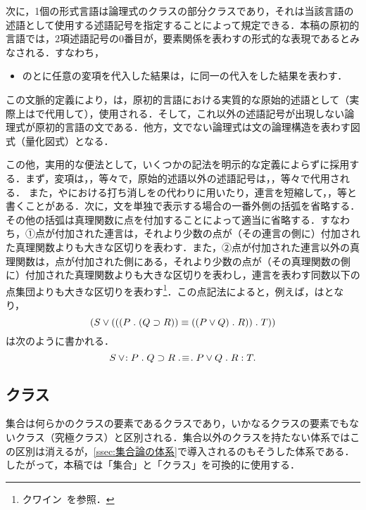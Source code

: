 次に，1個の形式言語は論理式のクラスの部分クラスであり，それは当該言語の述語として使用する述語記号を指定することによって規定できる．本稿の原初的言語では，$2$項述語記号の$0$番目が，要素関係を表わす\kagi{$ \in $}の形式的な表現であるとみなされる．すなわち，
\begin{itemize}
    \item \kagi{$\alpha\in\beta$}の\kagi{$\alpha$}と\kagi{$\beta$}に任意の変項を代入した結果は，に同一の代入をした結果を表わす．
\end{itemize}
この文脈的定義により，は，原初的言語における実質的な原始的述語として（実際上は\kagi{$ \in $}で代用して），使用される．そして，これ以外の述語記号が出現しない論理式が原初的言語の文である．他方，文でない論理式は文の論理構造を表わす図式（量化図式）となる．

この他，実用的な便法として，いくつかの記法を明示的な定義によらずに採用する．まず，変項は，，等々で，原始的述語以外の述語記号は，，等々で代用される．
また，\kagi{$\notin$}や\kagi{$\neq$}における打ち消しを\kagi{$\neg$}の代わりに用いたり，連言を短縮して，，等と書くことがある．次に，文を単独で表示する場合の一番外側の括弧を省略する．その他の括弧は真理関数に点を付加することによって適当に省略する．すなわち，①点が付加された連言は，それより少数の点が（その連言の側に）付加された真理関数よりも大きな区切りを表わす．また，②点が付加された連言以外の真理関数は，点が付加された側にある，それより少数の点が（その真理関数の側に）付加された真理関数よりも大きな区切りを表わし，連言を表わす同数以下の点集団よりも大きな区切りを表わす\footnote{
    クワイン~\cite[pp.\,26--28]{クワインb}を参照．
}．この点記法によると，例えば，はとなり，
\[
    (S\lor(((P\con{1}(Q\supset R))\equiv((P\lor Q)\con{1}R))\con{1}T))
\]
は次のように書かれる．
\[
    S\case{2}{0}{2}P\con{1}Q\supset R\case{3}{1}{1}P\lor Q\con{1}R\con{2}T.
\]

\subsection{クラス}
\label{ssec:クラス}

集合は何らかのクラスの要素であるクラスであり，いかなるクラスの要素でもないクラス（究極クラス）と区別される．集合以外のクラスを持たない体系ではこの区別は消えるが，\ref{ssec:集合論の体系}で導入されるのもそうした体系である．したがって，本稿では「集合」と「クラス」を可換的に使用する．


